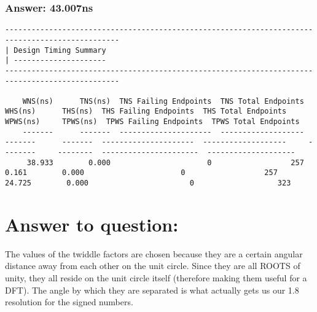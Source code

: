 \documentclass[11pt]{report}
\begin{document}
\subsubsection*{Answer: 43.007ns}
\begin{lstlisting}
------------------------------------------------------------------------------------------------
| Design Timing Summary
| ---------------------
------------------------------------------------------------------------------------------------

    WNS(ns)      TNS(ns)  TNS Failing Endpoints  TNS Total Endpoints      WHS(ns)      THS(ns)  THS Failing Endpoints  THS Total Endpoints     WPWS(ns)     TPWS(ns)  TPWS Failing Endpoints  TPWS Total Endpoints  
    -------      -------  ---------------------  -------------------      -------      -------  ---------------------  -------------------     --------     --------  ----------------------  --------------------  
     38.933        0.000                      0                  257        0.161        0.000                      0                  257       24.725        0.000                       0                   323  
\end{lstlisting}
\newpage









\normalsize
\section*{Answer to question:}
The values of the twiddle factors are chosen because they are a certain angular distance away from each other on the unit circle. Since they are all ROOTS of unity, they all reside on the unit circle itself (therefore making them useful for a DFT). The angle by which they are separated is what actually gets us our 1.8 resolution for the signed numbers. 
\end{document}
